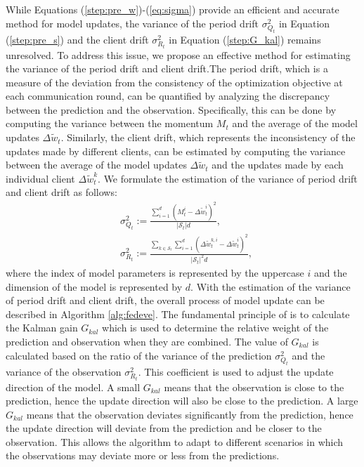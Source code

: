 While Equations (\ref{step:pre_w})-(\ref{eq:sigma}) provide an efficient and accurate method for model updates, the variance of the period drift $\sigma_{Q_t}^2$ in Equation (\ref{step:pre_s}) and the client drift $\sigma_{R_t}^2$ in Equation (\ref{step:G_kal}) remains unresolved. To address this issue, we propose an effective method for estimating the variance of the period drift and client drift.The period drift, which is a measure of the deviation from the consistency of the optimization objective at each communication round, can be quantified by analyzing the discrepancy between the prediction and the observation. Specifically, this can be done by computing the variance between the momentum $M_t$ and the average of the model updates $\Delta\tilde{w}_{t}$. Similarly, the client drift, which represents the inconsistency of the updates made by different clients, can be estimated by computing the variance between the average of the model updates $\Delta\tilde{w}_{t}$ and the updates made by each individual client $\Delta\tilde{w}_{t}^k$. We formulate the estimation of the variance of period drift and client drift as follows:
\begin{equation}
\begin{aligned}
&\sigma_{Q_t}^2:= \frac{\sum_{i=1}^d(M^i_t-\Delta\tilde{w}^i_{t})^2}{|\mathcal{S}_t|d},\\
&\sigma_{R_t}^2:=\frac{\sum_{k \in \mathcal{S}_t}\sum_{i=1}^d(\Delta\tilde{w}_{t}^{k,i}-\Delta\tilde{w}^i_{t})^2}{|\mathcal{S}_t|^2d},
\end{aligned}
\end{equation}
where the index of model parameters is represented by the uppercase $i$ and the dimension of the model is represented by $d$. With the estimation of
 the variance of period drift and client drift, the overall process of model update can be described in Algorithm \ref{alg:fedeve}. 
The fundamental principle of \fedeve is to calculate the Kalman gain $G_{kal}$ which is used to determine the relative weight of the prediction and observation when they are combined. The value of $G_{kal}$ is calculated based on the ratio of the variance of the prediction $\sigma_{Q_t}^2$ and the variance of the observation $\sigma_{R_t}^2$. This coefficient is used to adjust the update direction of the model. A small $G_{kal}$ means that the observation is close to the prediction, hence the update direction will also be close to the prediction. A large $G_{kal}$ means that the observation deviates significantly from the prediction, hence the update direction will deviate from the prediction and be closer to the observation. This allows the algorithm to adapt to different scenarios in which the observations may deviate more or less from the predictions.
